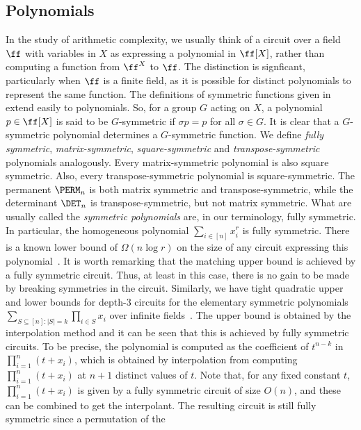\documentclass{toc}
\begin{document}
\subsection{Polynomials}\label{sec:polynomials}
In the study of arithmetic complexity, we usually think of a circuit over a
field $\ff$ with variables in $X$ as expressing a polynomial in $\ff[X]$, rather
than computing a function from $\ff^X$ to $\ff$. The distinction is signficant,
particularly when $\ff$ is a finite field, as it is possible for distinct
polynomials to represent the same function.
The definitions of symmetric functions given in
 extend easily to polynomials. So, for a
group $G$ acting on $X$, a polynomial $p \in \ff[X]$ is said to be $G$-symmetric
if $\sigma p = p$ for all $\sigma \in G$.   It is clear that a $G$-symmetric polynomial
determines a $G$-symmetric function.  We define \emph{fully symmetric},
\emph{matrix-symmetric}, \emph{square-symmetric} and \emph{transpose-symmetric}
polynomials analogously. Every matrix-symmetric polynomial is also square
symmetric. Also, every transpose-symmetric polynomial is square-symmetric. The
permanent $\PERM_n$ is both matrix symmetric and transpose-symmetric, while the
determinant $\DET_n$ is transpose-symmetric, but not matrix symmetric.
What are usually called the \emph{symmetric polynomials} are, in our
terminology, fully symmetric. In particular, the homogeneous polynomial $\sum_{i
  \in [n]}x_i^r$ is fully symmetric. There is a known lower bound of $\Omega(n
\log r)$ on the size of any circuit expressing this polynomial~\cite{BaurS83}.
It is worth remarking that the matching upper bound is achieved by a fully symmetric
circuit. Thus, at least in this case, there is no gain to be made by breaking
symmetries in the circuit.  Similarly, we have tight quadratic upper and lower
bounds for depth-3 circuits for the elementary symmetric polynomials $\sum_{S \subseteq [n] : |S|=k}\prod_{i\in
  S}x_i$ over infinite fields~\cite{ShpilkaW01}.  The upper
bound is obtained  by the interpolation method and it can be seen that this is achieved by
fully symmetric circuits.  To be precise, the polynomial is computed
as the coefficient of $t^{n-k}$ in $\prod_{i=1}^n (t+x_i)$, which is
obtained by interpolation from computing $\prod_{i=1}^n (t+x_i)$ at
$n+1$ distinct values of $t$.  Note that, for any fixed constant $t$,
$\prod_{i=1}^n (t+x_i)$ is given by a fully symmetric circuit of size
$O(n)$, and these can be combined to get the interpolant.  The
resulting circuit is still fully symmetric since a permutation of the
\end{document}
